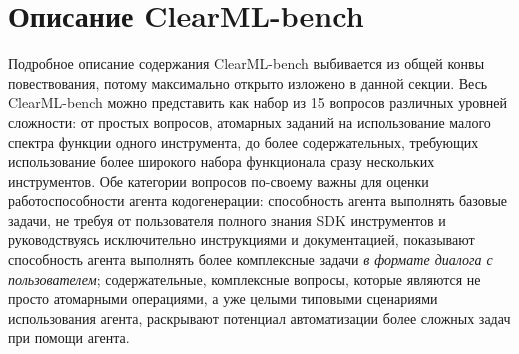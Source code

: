 \chapter{Описание ClearML-bench}\label{appendix-clearml-bench}

Подробное описание содержания ClearML-bench выбивается из общей конвы повествования, потому
максимально открыто изложено в данной секции. Весь ClearML-bench можно представить
как набор из 15 вопросов различных уровней сложности: от простых вопросов, атомарных заданий на 
использование малого спектра функции одного инструмента, до более содержательных,
требующих использование более широкого набора функционала сразу нескольких инструментов.
Обе категории вопросов по-своему важны для оценки работоспособности агента кодогенерации:
способность агента выполнять базовые задачи, не требуя от
пользователя полного знания SDK инструментов и руководствуясь исключительно инструкциями и документацией, 
показывают способность агента выполнять более комплексные
задачи \textit{в формате диалога с пользователем}; содержательные, комплексные вопросы,
которые являются не просто атомарными операциями, а уже целыми типовыми сценариями использования агента,
раскрывают потенциал автоматизации более сложных задач при помощи агента.

